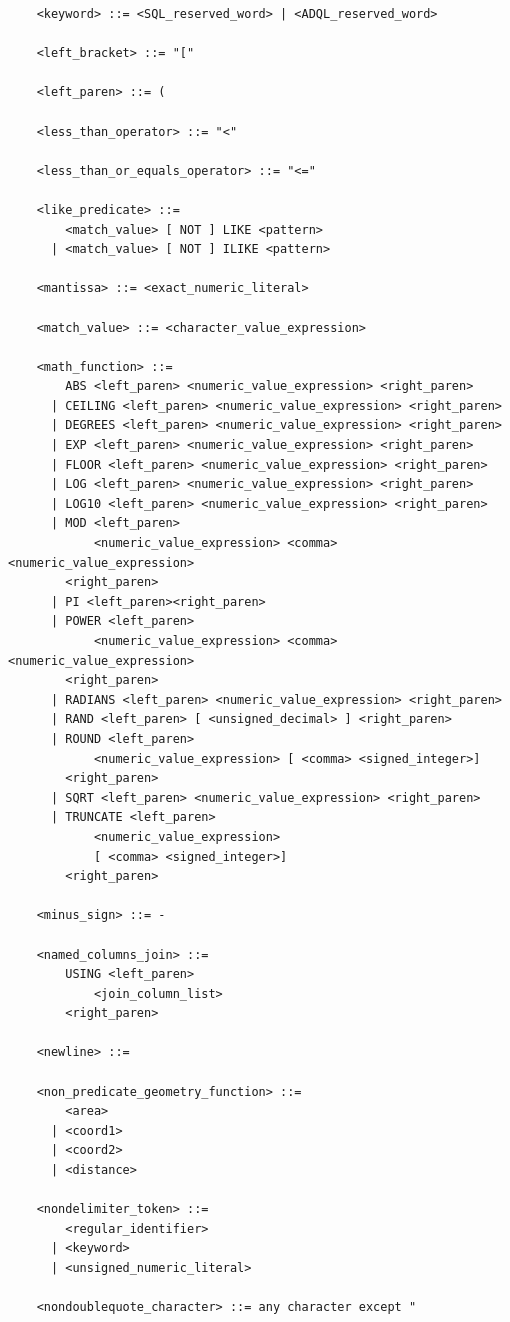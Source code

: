 \documentclass[11pt,a4paper]{ivoa}
\begin{document}
\begin{verbatim}
    <keyword> ::= <SQL_reserved_word> | <ADQL_reserved_word>

    <left_bracket> ::= "["

    <left_paren> ::= (

    <less_than_operator> ::= "<"

    <less_than_or_equals_operator> ::= "<="

    <like_predicate> ::=
        <match_value> [ NOT ] LIKE <pattern>
      | <match_value> [ NOT ] ILIKE <pattern>

    <mantissa> ::= <exact_numeric_literal>

    <match_value> ::= <character_value_expression>

    <math_function> ::=
        ABS <left_paren> <numeric_value_expression> <right_paren>
      | CEILING <left_paren> <numeric_value_expression> <right_paren>
      | DEGREES <left_paren> <numeric_value_expression> <right_paren>
      | EXP <left_paren> <numeric_value_expression> <right_paren>
      | FLOOR <left_paren> <numeric_value_expression> <right_paren>
      | LOG <left_paren> <numeric_value_expression> <right_paren>
      | LOG10 <left_paren> <numeric_value_expression> <right_paren>
      | MOD <left_paren>
            <numeric_value_expression> <comma> <numeric_value_expression>
        <right_paren>
      | PI <left_paren><right_paren>
      | POWER <left_paren>
            <numeric_value_expression> <comma> <numeric_value_expression>
        <right_paren>
      | RADIANS <left_paren> <numeric_value_expression> <right_paren>
      | RAND <left_paren> [ <unsigned_decimal> ] <right_paren>
      | ROUND <left_paren>
            <numeric_value_expression> [ <comma> <signed_integer>]
        <right_paren>
      | SQRT <left_paren> <numeric_value_expression> <right_paren>
      | TRUNCATE <left_paren>
            <numeric_value_expression>
            [ <comma> <signed_integer>]
        <right_paren>

    <minus_sign> ::= -

    <named_columns_join> ::=
        USING <left_paren>
            <join_column_list>
        <right_paren>

    <newline> ::=

    <non_predicate_geometry_function> ::=
        <area>
      | <coord1>
      | <coord2>
      | <distance>

    <nondelimiter_token> ::=
        <regular_identifier>
      | <keyword>
      | <unsigned_numeric_literal>

    <nondoublequote_character> ::= any character except "


\end{verbatim}
\end{document}
